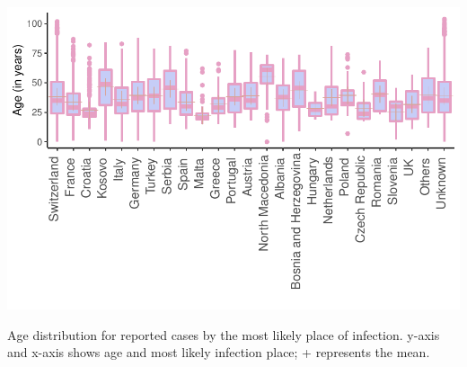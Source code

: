 \documentclass[10pt, a4paper, twoside]{article}
\begin{document}
\clearpage
\begin{suppfigure}[h]
\centering
\includegraphics[scale=0.4]{age_percountry_2021-03-05.pdf}
\caption{Age distribution for reported cases by the most likely place of infection. y-axis and x-axis shows age and most likely infection place; + represents the mean.}
\end{suppfigure}
\end{document}
